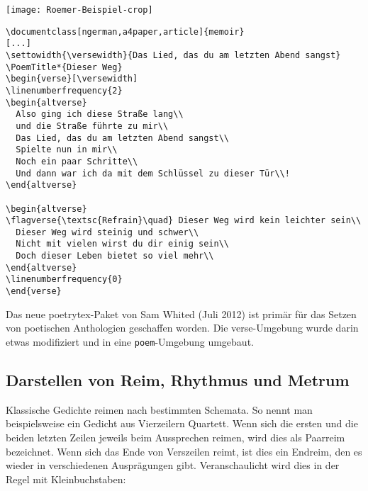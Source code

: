 \begin{center}
\texttt{[image: Roemer-Beispiel-crop]}
\end{center}

\begin{lstlisting}
\documentclass[ngerman,a4paper,article]{memoir}
[...]
\settowidth{\versewidth}{Das Lied, das du am letzten Abend sangst}
\PoemTitle*{Dieser Weg}
\begin{verse}[\versewidth]
\linenumberfrequency{2}
\begin{altverse}
  Also ging ich diese Straße lang\\
  und die Straße führte zu mir\\
  Das Lied, das du am letzten Abend sangst\\
  Spielte nun in mir\\
  Noch ein paar Schritte\\
  Und dann war ich da mit dem Schlüssel zu dieser Tür\\!
\end{altverse}

\begin{altverse}
\flagverse{\textsc{Refrain}\quad} Dieser Weg wird kein leichter sein\\
  Dieser Weg wird steinig und schwer\\
  Nicht mit vielen wirst du dir einig sein\\
  Doch dieser Leben bietet so viel mehr\\
\end{altverse}
\linenumberfrequency{0}
\end{verse}
\end{lstlisting}

Das neue poetrytex-Paket von Sam Whited (Juli 2012) ist primär für das Setzen
von poetischen Anthologien geschaffen worden. Die verse-Umgebung wurde darin
etwas modifiziert und in eine \texttt{poem}-Umgebung umgebaut.


\subsection{Darstellen von Reim, Rhythmus und Metrum}

Klassische Gedichte reimen nach bestimmten Schemata. So nennt man beispielsweise
ein Gedicht aus Vierzeilern Quartett. Wenn sich die ersten und die beiden letzten
Zeilen jeweils beim Aussprechen reimen, wird dies als Paarreim bezeichnet. 
Wenn sich das Ende von Verszeilen reimt, ist dies ein Endreim, den es wieder in
verschiedenen Ausprägungen gibt. Veranschaulicht wird dies in der Regel mit
Kleinbuchstaben:

